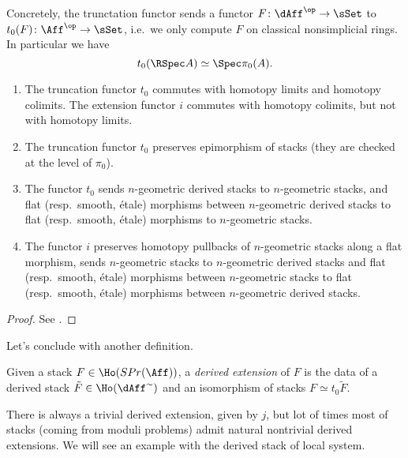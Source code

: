         Concretely, the trunctation functor sends a functor $F\colon \dAff^{\op} \to \sSet$ to $t_0(F)\colon \Aff^{\op} \to \sSet$, i.e.\ we only compute $F$ on classical nonsimplicial rings. In particular we have \[t_0(\RSpec A) \simeq \Spec \pi_0(A). \]
        \begin{prop}\hfill
            \label{prop:properties_truncation}
            \begin{enumerate}
                \item The truncation functor $t_0$ commutes with homotopy limits and homotopy colimits. The extension functor $i$ commutes with homotopy colimits, but not with homotopy limits.
                \item The truncation functor $t_0$ preserves epimorphism of stacks (they are checked at the level of $\pi_0$).
                \item The functor $t_0$ sends $n$-geometric derived stacks to $n$-geometric stacks, and flat (resp.\ smooth, étale) morphisms between $n$-geometric derived stacks to flat (resp.\ smooth, étale) morphisms to $n$-geometric stacks.
                \item The functor $i$ preserves homotopy pullbacks of $n$-geometric stacks along a flat morphism, sends $n$-geometric stacks to $n$-geometric derived stacks and flat (resp.\ smooth, étale) morphisms between $n$-geometric stacks to flat (resp.\ smooth, étale) morphisms between $n$-geometric derived stacks.
            \end{enumerate}
        \end{prop}
        \begin{proof}
            See \cite[Proposition~2.2.4.4]{ToVe:hag2}.
        \end{proof}
        Let's conclude with another definition.
        \begin{defn}
            \label{defn:derived_extension}
            Given a stack $F \in \Ho(SPr(\Aff))$, a \emph{derived extension} of $F$ is the data of a derived stack $\tilde{F} \in \Ho(\dAff^{\sim})$ and an isomorphism of stacks $F \simeq t_0 \tilde{F}$.
        \end{defn}
        There is always a trivial derived extension, given by $j$, but lot of times most of stacks (coming from moduli problems) admit natural nontrivial derived extensions. We will see an example with the derived stack of local system.
        
